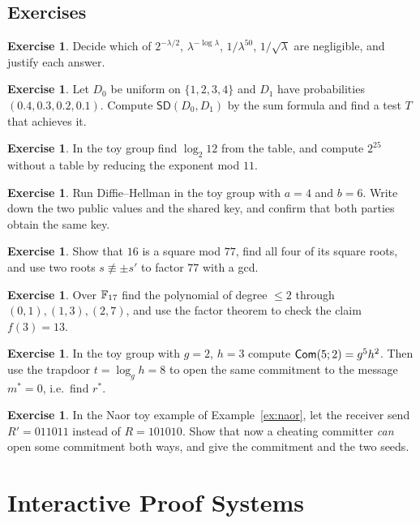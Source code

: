 \documentclass[11pt,a4paper]{report}
\theoremstyle{plain}
\theoremstyle{definition}
\newtheorem{exercise}[theorem]{Exercise}
\theoremstyle{remark}
\newcommand{\SD}{\mathsf{SD}}
\begin{document}
\section*{Exercises}
\begin{exercise}
Decide which of $2^{-\lambda/2}$, $\lambda^{-\log\lambda}$, $1/\lambda^{50}$, $1/\sqrt{\lambda}$ are negligible, and justify each answer.
\end{exercise}
\begin{exercise}
Let $D_0$ be uniform on $\{1,2,3,4\}$ and $D_1$ have probabilities $(0.4,0.3,0.2,0.1)$. Compute $\SD(D_0,D_1)$ by the sum formula and find a test $T$ that achieves it.
\end{exercise}
\begin{exercise}
In the toy group find $\log_2 12$ from the table, and compute $2^{25}$ without a table by reducing the exponent mod $11$.
\end{exercise}
\begin{exercise}
Run Diffie--Hellman in the toy group with $a=4$ and $b=6$. Write down the two public values and the shared key, and confirm that both parties obtain the same key.
\end{exercise}
\begin{exercise}
Show that $16$ is a square mod $77$, find all four of its square roots, and use two roots $s\not\equiv\pm s'$ to factor $77$ with a gcd.
\end{exercise}
\begin{exercise}
Over $\mathbb{F}_{17}$ find the polynomial of degree $\le2$ through $(0,1),(1,3),(2,7)$, and use the factor theorem to check the claim $f(3)=13$.
\end{exercise}
\begin{exercise}
In the toy group with $g=2$, $h=3$ compute $\mathsf{Com}(5;2)=g^5h^2$. Then use the trapdoor $t=\log_gh=8$ to open the same commitment to the message $m^*=0$, i.e.\ find $r^*$.
\end{exercise}
\begin{exercise}
In the Naor toy example of Example~\ref{ex:naor}, let the receiver send $R'=011011$ instead of $R=101010$. Show that now a cheating committer \emph{can} open some commitment both ways, and give the commitment and the two seeds.
\end{exercise}

\chapter{Interactive Proof Systems}\label{ch:ip}
\end{document}

